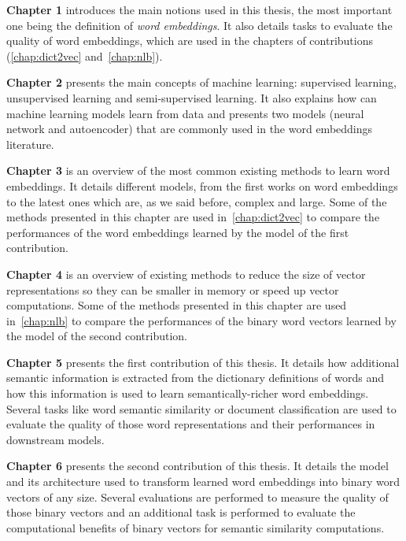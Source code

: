     \textbf{Chapter 1} introduces the main notions used in this thesis, the most
    important one being the definition of \textit{word embeddings}. It also
    details tasks to evaluate the quality of word embeddings, which are used in
    the chapters of contributions (\autoref{chap:dict2vec}
    and~\autoref{chap:nlb}). \medskip

    \textbf{Chapter 2} presents the main concepts of machine learning:
    supervised learning, unsupervised learning and semi-supervised learning. It
    also explains how can machine learning models learn from data and presents
    two models (neural network and autoencoder) that are commonly used in the
    word embeddings literature. \medskip

    \textbf{Chapter 3} is an overview of the most common existing methods to
    learn word embeddings. It details different models, from the first works on
    word embeddings to the latest ones which are, as we said before, complex and
    large. Some of the methods presented in this chapter are used
    in~\autoref{chap:dict2vec} to compare the performances of the word
    embeddings learned by the model of the first contribution. \medskip

    \textbf{Chapter 4} is an overview of existing methods to reduce the size of
    vector representations so they can be smaller in memory or speed up vector
    computations. Some of the methods presented in this chapter are used
    in~\autoref{chap:nlb} to compare the performances of the binary word vectors
    learned by the model of the second contribution. \medskip

    \textbf{Chapter 5} presents the first contribution of this thesis. It
    details how additional semantic information is extracted from the dictionary
    definitions of words and how this information is used to learn
    semantically-richer word embeddings. Several tasks like word semantic
    similarity or document classification are used to evaluate the quality of
    those word representations and their performances in downstream models.
    \medskip

    \textbf{Chapter 6} presents the second contribution of this thesis. It
    details the model and its architecture used to transform learned word
    embeddings into binary word vectors of any size. Several evaluations are
    performed to measure the quality of those binary vectors and an additional
    task is performed to evaluate the computational benefits of binary vectors
    for semantic similarity computations.
